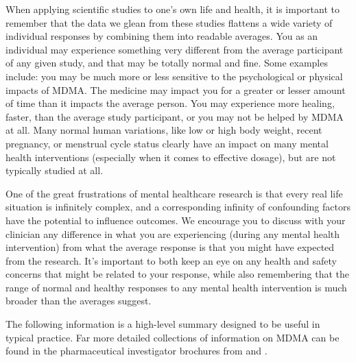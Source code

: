 \documentclass[12pt,letterpaper]{book}
\begin{document}
When applying scientific studies to one's own life and health, it is important to remember that the data we glean from these studies flattens a wide variety of individual responses by combining them into readable averages. You as an individual may experience something very different from the average participant of any given study, and that may be totally normal and fine. Some examples include: you may be much more or less sensitive to the psychological or physical impacts of MDMA. The medicine may impact you for a greater or lesser amount of time than it impacts the average person. You may experience more healing, faster, than the average study participant, or you may not be helped by MDMA at all. Many normal human variations, like low or high body weight, recent pregnancy, or menstrual cycle status clearly have an impact on many mental health interventions (especially when it comes to effective dosage), but are not typically studied at all.

One of the great frustrations of mental healthcare research is that every real life situation is infinitely complex, and a corresponding infinity of confounding factors have the potential to influence outcomes. We encourage you to discuss with your clinician any difference in what you are experiencing (during any mental health intervention) from what the average response is that you might have expected from the research. It's important to both keep an eye on any health and safety concerns that might be related to your response, while also remembering that the range of normal and healthy responses to any mental health intervention is much broader than the averages suggest.

The following information is a high-level summary designed to be useful in typical practice. Far more detailed collections of information on MDMA can be found in the pharmaceutical investigator brochures from \textcite{mapsInvestigatorBrochure} and \textcite{pharmalaInvestigatorBrochure}.
\end{document}
